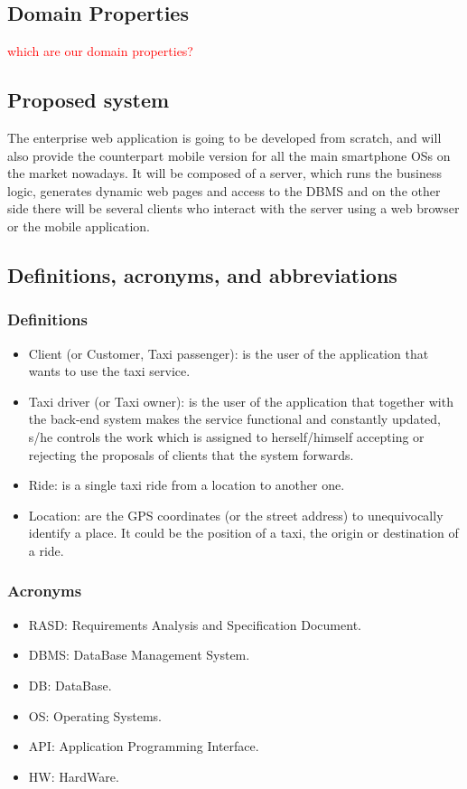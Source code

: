 \documentclass[a4paper,11pt]{report} %
\begin{document}
	\subsection{Domain Properties} \textcolor{red}{which are our domain properties?}
	
	\subsection{Proposed system}
	The enterprise web application is going to be developed from scratch, and will also provide the counterpart mobile version for all the main smartphone OSs on the market nowadays. It will be composed of a server, which runs the business logic, generates dynamic web pages and access to the DBMS and on the other side there will be several clients who interact with the server using a web browser or the mobile application.
	
	\subsection{Definitions, acronyms, and abbreviations}
	
	\subsubsection{Definitions}
		\begin{itemize}
			\item Client (or Customer, Taxi passenger): is the user of the application that wants to use the taxi service.
			\item Taxi driver (or Taxi owner): is the user of the application that together with the back-end system makes the service functional and constantly updated, s/he controls the work which is assigned to herself/himself accepting or rejecting the proposals of clients that the system forwards. 
			\item Ride: is a single taxi ride from a location to another one.
			\item Location: are the GPS coordinates (or the street address) to unequivocally identify a place. It could be the position of a taxi, the origin or destination of a ride.
		\end{itemize}
		
	\subsubsection{Acronyms}
	\begin{itemize}
		\item RASD: Requirements Analysis and Specification Document.
		\item DBMS: DataBase Management System.
		\item DB: DataBase.
		\item OS: Operating Systems.
		\item API: Application Programming Interface.
		\item HW: HardWare.
	\end{itemize}
	
\end{document}
